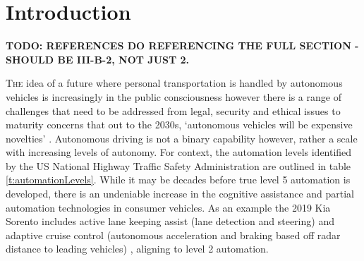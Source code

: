 \documentclass[]{aiaa-tc}%
\begin{document}
\newpage
\section{Introduction} \label{sect:intro}
 \textbf{TODO: REFERENCES DO REFERENCING THE FULL SECTION - SHOULD BE III-B-2, NOT JUST 2.}
 
\lettrine[nindent=0pt]{T}{he} idea of a future where personal transportation is handled by autonomous vehicles is increasingly in the public consciousness however there is a range of challenges that need to be addressed from legal, security and ethical issues \citep{gmReport} to maturity concerns that out to the 2030s, `autonomous vehicles will be expensive novelties' \citep{vicTransportImplications}. Autonomous driving is not a binary capability however, rather a scale with increasing levels of autonomy. For context, the automation levels identified by the US National Highway Traffic Safety Administration \citep{automationVisionForSafety} are outlined in table \ref{t:automationLevels}. While it may be decades before true level 5 automation is developed, there is an undeniable increase in the cognitive assistance and partial automation technologies in consumer vehicles. As an example the 2019 Kia Sorento includes active lane keeping assist (lane detection and steering) and adaptive cruise control (autonomous acceleration and braking based off radar distance to leading vehicles) \citep{kia}, aligning to level 2 automation. 
\end{document}
